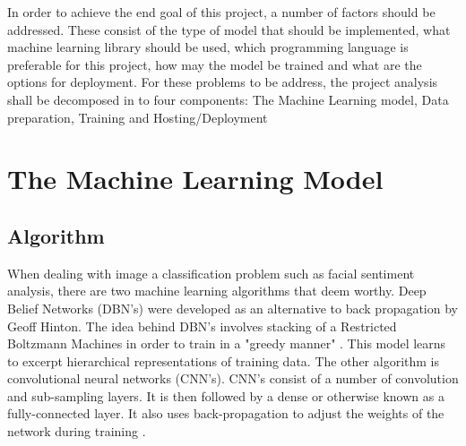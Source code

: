 In order to achieve the end goal of this project, a number of factors should be addressed. These consist of the type of model that should be implemented, what machine learning library should be used, which programming language is preferable for this project, how may the model be trained and what are the options for deployment. For these problems to be address, the project analysis shall be decomposed in to four components: The Machine Learning model, Data preparation, Training and Hosting/Deployment


 	
 	


\section{The Machine Learning Model}


\subsection{Algorithm}
When dealing with image a classification problem such as facial sentiment analysis, there are two machine learning algorithms that deem worthy. Deep Belief Networks (DBN's) were developed as an alternative to back propagation by Geoff Hinton. The idea behind DBN's involves stacking of a Restricted Boltzmann Machines in order to train in a "greedy manner" \citep{dbn}. This model learns to excerpt hierarchical representations of training data. The other algorithm is convolutional neural networks (CNN's). CNN's consist of a number of convolution and sub-sampling layers. It is then followed by a dense or otherwise known as a fully-connected layer. It also uses back-propagation to adjust the weights of the network during training \citep{gupta}. 


